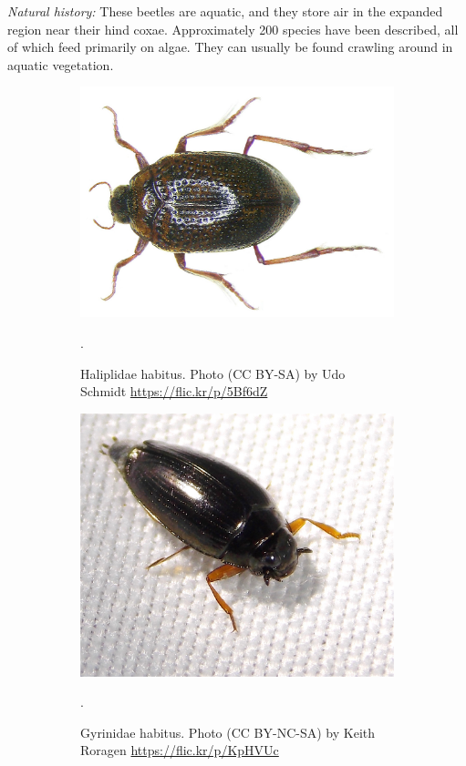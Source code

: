 \documentclass[letterpaper, 11pt]{article}
\begin{document}
\noindent{}\textit{Natural history:} These beetles are aquatic, and they store air in the expanded region near their hind coxae. Approximately 200 species have been described, all of which feed primarily on algae. They can usually be found crawling around in aquatic vegetation.

\begin{figure}[ht!]
  \centering
\begin{subfigure}[ht!]{0.4\textwidth}
   \includegraphics[width=\textwidth]{HaliplidHabitus}
  \caption{Haliplidae habitus. Photo (CC BY-SA) by Udo Schmidt \url{https://flic.kr/p/5Bf6dZ}}.
  \label{fig:haliplids}
\end{subfigure}
    \qquad
\begin{subfigure}[ht!]{0.4\textwidth}
\includegraphics[width=\textwidth]{GyrinidHabitus}
  \caption{Gyrinidae habitus. Photo (CC BY-NC-SA) by Keith Roragen \url{https://flic.kr/p/KpHVUc}}.
  \label{fig:gyrinid}
\end{subfigure}
    \caption{}
\end{figure}
\end{document}
